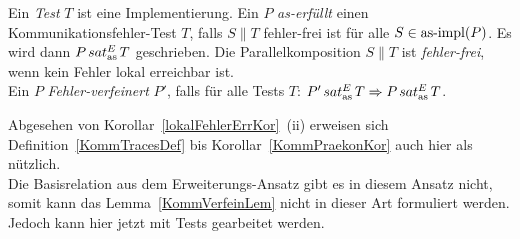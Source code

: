 \begin{Def}
  \label{KommTestDef}
  Ein \emph{Test} $T$ ist eine Implementierung. Ein \MEIO{} $P$
  \emph{as-erfüllt} einen Kommunikationsfehler-Test $T$, falls $S\|T$
  fehler-frei ist für alle $S\in \mathrm{as}\text{-}\mathrm{impl} (P)$. Es wird dann $P \hspace{0.05cm}sat_\mathrm{as}^E\hspace{0.05cm} T$
  geschrieben. Die Parallelkomposition $S\|T$ ist \emph{fehler-frei}, wenn kein
  Fehler lokal erreichbar ist.\\
  Ein \MEIO{} $P$ \emph{Fehler-verfeinert} $P'$, falls für alle Tests $T$:
  $P'\hspace{0.05cm}sat_\mathrm{as}^E\hspace{0.05cm} T \Rightarrow P\hspace{0.05cm}sat_\mathrm{as}^E\hspace{0.05cm} T$.
\end{Def}

Abgesehen von Korollar~\ref{lokalFehlerErrKor}~(ii) erweisen sich
Definition~\ref{KommTracesDef} bis Korollar~\ref{KommPraekonKor} auch hier als
nützlich.\\
Die Basisrelation aus dem Erweiterungs-Ansatz gibt es in diesem Ansatz nicht,
somit kann das Lemma~\ref{KommVerfeinLem} nicht in dieser Art formuliert
werden. Jedoch kann hier jetzt mit Tests gearbeitet werden.

